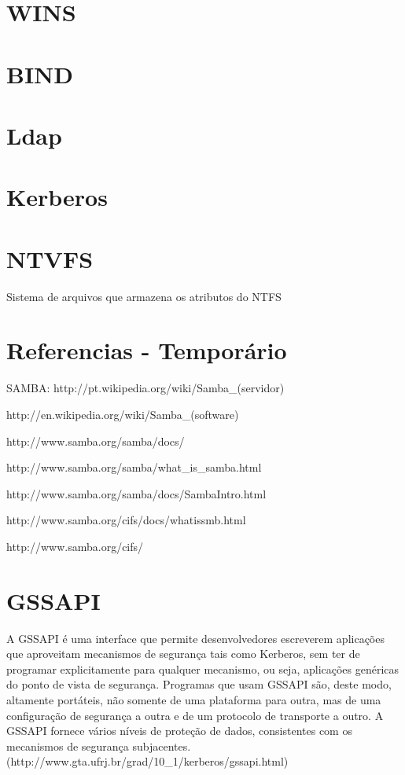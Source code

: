 \section{WINS}

\section{BIND}

\section{Ldap}

\section{Kerberos}

\section{NTVFS}

Sistema de arquivos que armazena os atributos do NTFS

\section{Referencias - Temporário}
SAMBA:
http://pt.wikipedia.org/wiki/Samba\_(servidor)

http://en.wikipedia.org/wiki/Samba\_(software)

http://www.samba.org/samba/docs/

http://www.samba.org/samba/what\_is\_samba.html

http://www.samba.org/samba/docs/SambaIntro.html

http://www.samba.org/cifs/docs/what\-is\-smb.html

http://www.samba.org/cifs/

\section{GSSAPI}

A GSSAPI é uma interface que permite desenvolvedores escreverem aplicações que aproveitam mecanismos de segurança tais como Kerberos, sem ter de programar explicitamente para qualquer mecanismo, ou seja, aplicações genéricas do ponto de vista de segurança. Programas que usam GSSAPI são, deste modo, altamente portáteis, não somente de uma plataforma para outra, mas de uma configuração de segurança a outra e de um protocolo de transporte a outro. A GSSAPI fornece vários níveis de proteção de dados, consistentes com os mecanismos de segurança subjacentes. (http://www.gta.ufrj.br/grad/10\_1/kerberos/gssapi.html)